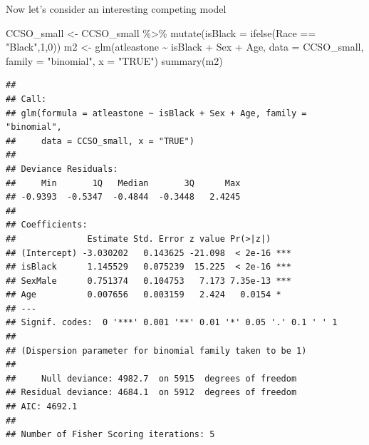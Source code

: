 \documentclass[
  ignorenonframetext,
]{beamer}
\newenvironment{Shaded}{\begin{snugshade}}{\end{snugshade}}
\newcommand{\AttributeTok}[1]{\textcolor[rgb]{0.77,0.63,0.00}{#1}}
\newcommand{\DecValTok}[1]{\textcolor[rgb]{0.00,0.00,0.81}{#1}}
\newcommand{\FunctionTok}[1]{\textcolor[rgb]{0.00,0.00,0.00}{#1}}
\newcommand{\NormalTok}[1]{#1}
\newcommand{\OtherTok}[1]{\textcolor[rgb]{0.56,0.35,0.01}{#1}}
\newcommand{\SpecialCharTok}[1]{\textcolor[rgb]{0.00,0.00,0.00}{#1}}
\newcommand{\StringTok}[1]{\textcolor[rgb]{0.31,0.60,0.02}{#1}}
\begin{document}
\begin{frame}[fragile]{}
\protect\hypertarget{section-11}{}
Now let's consider an interesting competing model

\tiny

\begin{Shaded}
\begin{Highlighting}[]
\NormalTok{CCSO\_small }\OtherTok{\textless{}{-}}\NormalTok{ CCSO\_small }\SpecialCharTok{\%\textgreater{}\%} \FunctionTok{mutate}\NormalTok{(}\AttributeTok{isBlack =} \FunctionTok{ifelse}\NormalTok{(Race }\SpecialCharTok{==} \StringTok{"Black"}\NormalTok{,}\DecValTok{1}\NormalTok{,}\DecValTok{0}\NormalTok{))}
\NormalTok{m2 }\OtherTok{\textless{}{-}} \FunctionTok{glm}\NormalTok{(atleastone }\SpecialCharTok{\textasciitilde{}}\NormalTok{ isBlack }\SpecialCharTok{+}\NormalTok{ Sex }\SpecialCharTok{+}\NormalTok{ Age, }\AttributeTok{data =}\NormalTok{ CCSO\_small, }
          \AttributeTok{family =} \StringTok{"binomial"}\NormalTok{, }\AttributeTok{x =} \StringTok{"TRUE"}\NormalTok{)}
\FunctionTok{summary}\NormalTok{(m2)}
\end{Highlighting}
\end{Shaded}

\begin{verbatim}
## 
## Call:
## glm(formula = atleastone ~ isBlack + Sex + Age, family = "binomial", 
##     data = CCSO_small, x = "TRUE")
## 
## Deviance Residuals: 
##     Min       1Q   Median       3Q      Max  
## -0.9393  -0.5347  -0.4844  -0.3448   2.4245  
## 
## Coefficients:
##              Estimate Std. Error z value Pr(>|z|)    
## (Intercept) -3.030202   0.143625 -21.098  < 2e-16 ***
## isBlack      1.145529   0.075239  15.225  < 2e-16 ***
## SexMale      0.751374   0.104753   7.173 7.35e-13 ***
## Age          0.007656   0.003159   2.424   0.0154 *  
## ---
## Signif. codes:  0 '***' 0.001 '**' 0.01 '*' 0.05 '.' 0.1 ' ' 1
## 
## (Dispersion parameter for binomial family taken to be 1)
## 
##     Null deviance: 4982.7  on 5915  degrees of freedom
## Residual deviance: 4684.1  on 5912  degrees of freedom
## AIC: 4692.1
## 
## Number of Fisher Scoring iterations: 5
\end{verbatim}
\end{frame}
\end{document}
